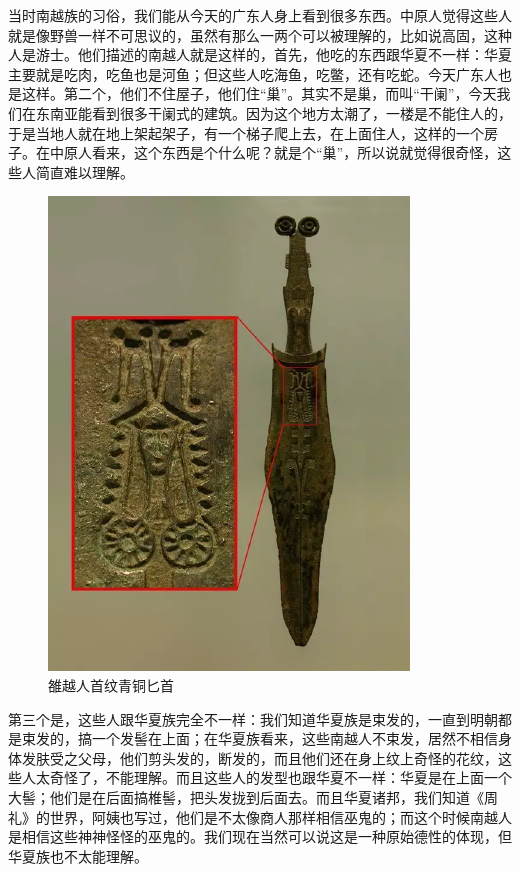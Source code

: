 当时南越族的习俗，我们能从今天的广东人身上看到很多东西。中原人觉得这些人就是像野兽一样不可思议的，虽然有那么一两个可以被理解的，比如说高固，这种人是游士。他们描述的南越人就是这样的，首先，他吃的东西跟华夏不一样：华夏主要就是吃肉，吃鱼也是河鱼；但这些人吃海鱼，吃鳖，还有吃蛇。今天广东人也是这样。第二个，他们不住屋子，他们住“巢”。其实不是巢，而叫“干阑”，今天我们在东南亚能看到很多干阑式的建筑。因为这个地方太潮了，一楼是不能住人的，于是当地人就在地上架起架子，有一个梯子爬上去，在上面住人，这样的一个房子。在中原人看来，这个东西是个什么呢？就是个“巢”，所以说就觉得很奇怪，这些人简直难以理解。

\begin{figure}
	\centering
	\includegraphics[width=\textwidth]{images/image-6}
	\caption{雒越人首纹青铜匕首}
\end{figure}

第三个是，这些人跟华夏族完全不一样：我们知道华夏族是束发的，一直到明朝都是束发的，搞一个发髻在上面；在华夏族看来，这些南越人不束发，居然不相信身体发肤受之父母，他们剪头发的，断发的，而且他们还在身上纹上奇怪的花纹，这些人太奇怪了，不能理解。而且这些人的发型也跟华夏不一样：华夏是在上面一个大髻；他们是在后面搞椎髻，把头发拢到后面去。而且华夏诸邦，我们知道《周礼》的世界，阿姨也写过，他们是不太像商人那样相信巫鬼的；而这个时候南越人是相信这些神神怪怪的巫鬼的。我们现在当然可以说这是一种原始德性的体现，但华夏族也不太能理解。

